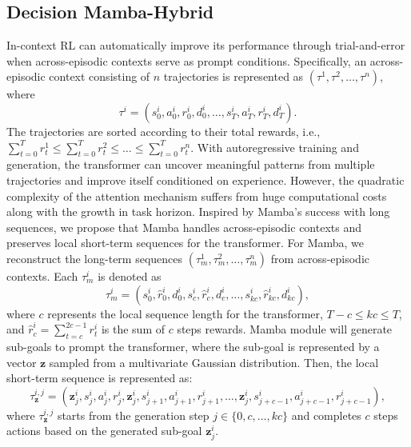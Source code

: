 \documentclass{article}
\begin{document}
\subsection{Decision Mamba-Hybrid}
In-context RL can automatically improve its performance through trial-and-error when across-episodic contexts serve as prompt conditions. Specifically, an across-episodic context consisting of $n$ trajectories is represented as $(\tau^{1},\tau^{2},\dots,\tau^{n})$, where
\begin{equation}
    \tau^{i}= (s_0^i,a_0^i,r_0^i,d_0^i,\dots,s_T^i,a_T^i,r_T^i,d_T^i).
\label{coe}
\end{equation}
The trajectories are sorted according to their total rewards, i.e.,$\sum_{t=0}^T{r_t^1}\leq\sum_{t=0}^T{r_t^2}\leq\dots\leq\sum_{t=0}^T{r_t^n}$. With autoregressive training and generation, the transformer can uncover meaningful patterns from multiple trajectories and improve itself conditioned on experience. However, the quadratic complexity of the attention mechanism suffers from huge computational costs along with the growth in task horizon. Inspired by Mamba's success with long sequences, we propose that Mamba handles across-episodic contexts and preserves local short-term sequences for the transformer. For Mamba, we reconstruct the long-term sequences $(\tau_m^{1},\tau_m^{2},\dots,\tau_m^{n})$ from across-episodic contexts. Each $\tau_m^{i}$ is denoted as
\begin{equation}
\tau_m^{i}=(s_0^i,\hat{r}_0^i,d_0^i,s_{c}^i,\hat{r}_{c}^i,d_{c}^i,\dots,s_{kc}^i,\hat{r}_{kc}^i,d_{kc}^i),
\label{mamba}
\end{equation}
where $c$ represents the local sequence length for the transformer, $T-c\leq kc \leq T$, and $\hat{r}_c^i=\sum_{t=c}^{2c-1}{r_t^i}$ is the sum of $c$ steps rewards. Mamba module will generate sub-goals to prompt the transformer, where the sub-goal is represented by a vector $\textbf{z}$ sampled from a multivariate Gaussian distribution. Then, the local short-term sequence is represented as:
\begin{equation}
\tau_\textbf{z}^{i,j}=(\textbf{z}_j^i,s_j^i,a_j^i,r_j^i, \textbf{z}_{j}^i,s_{j+1}^i,a_{j+1}^i,r_{j+1}^i, \dots,\textbf{z}_{j}^i,s_{j+c-1}^i,a_{j+c-1}^i,r_{j+c-1}^i),
\label{transformer}
\end{equation}
where $\tau_\textbf{z}^{i,j}$ starts from the generation step $j\in\{0,c,\dots,kc\}$ and completes $c$ steps actions based on the generated sub-goal $\textbf{z}_j^i$.
\end{document}
